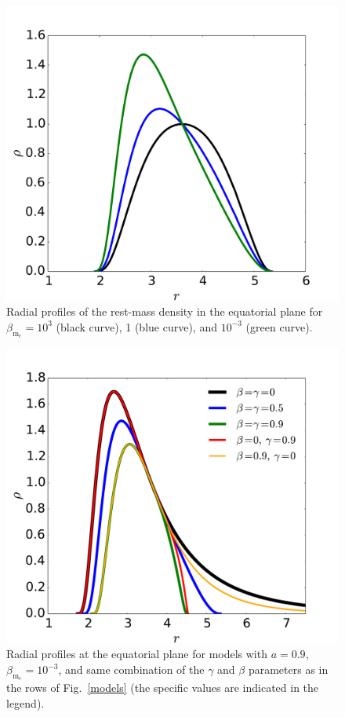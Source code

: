 \documentclass{aa}
\begin{document}
\begin{figure}[t]
\centering
\includegraphics[scale=0.2]{figures/fig4.pdf}
\caption{Radial profiles of the rest-mass density in the equatorial plane for {$\beta_{\mathrm{m}_{\mathrm{c}}}=10^3$} (black curve), 1 (blue curve), and $10^{-3}$ (green curve). }
\label{magnetisation-profile}
 \end{figure}
 
\begin{figure}[t]
\centering
\includegraphics[scale=0.2]{figures/fig5.pdf}
\caption{Radial profiles at the equatorial plane for models with $a=0.9$, $\beta_{\mathrm{m}_{\mathrm{c}}}
=10^{-3}$, and same combination of the $\gamma$ and $\beta$ parameters as in the rows of Fig.~\ref{models} (the specific values are indicated in the legend).}
\label{more-profile}
\end{figure}
\end{document}
